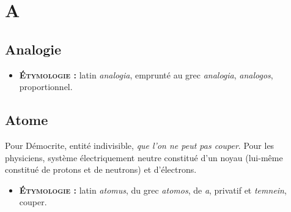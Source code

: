 \chapter{A}

\section{Analogie}

{\footnotesize
\begin{itemize}[leftmargin=1cm, label=, itemsep=1pt]
\item {\bf \textsc{Étymologie} :} latin {\it analogia},
emprunté au grec {\it analogia}, {\it analogos}, proportionnel.
\end{itemize}
}

\section{Atome}

Pour Démocrite, entité indivisible, {\it que l'on ne peut pas
couper}.
Pour les physiciens,
système électriquement neutre constitué d'un noyau (lui-même
constitué de protons et de neutrons) et d'électrons.
{\footnotesize
\begin{itemize}[leftmargin=1cm, label=, itemsep=1pt]
\item {\bf \textsc{Étymologie} :} latin {\it atomus}, du grec
{\it atomos}, de {\it a}, privatif et {\it temnein}, couper.
\end{itemize}
}

